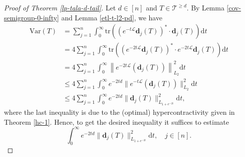 \documentclass{amsbook}
\theoremstyle{definition}
\theoremstyle{remark}
\numberwithin{section}{chapter}
\numberwithin{equation}{chapter}
\newcommand{\1}{\mathbf{1}}
\newcommand{\dc}{\mathbf{d}}
\begin{document}
\begin{proof}[Proof of Theorem \ref{lp-tala-d-tail}]
Let $d\in [n]$ and  $T\in \mathcal{T}^{\geq d}$.
By Lemma \ref{cov-semigroup-0-infty} and Lemma \ref{etl-t-l2-pd}, we have 
\begin{equation}\label{semigroup-approach-lp}
\begin{aligned}
\mathrm{Var}(T)
&=\sum_{j=1}^{n}\int_{0}^{\infty}\mathrm{tr}((e^{-t\mathcal{L}}\dc_{j}(T))^*\cdot \dc_{j}(T)) \mathrm{d}t\\
&=4\sum_{j=1}^{n}\int_{0}^{\infty}\mathrm{tr}((e^{-2t\mathcal{L}}\dc_{j}(T))^*\cdot e^{-2t\mathcal{L}}\dc_{j}(T)) \mathrm{d}t\\
&=4\sum_{j=1}^{n}\int_{0}^{\infty}\left\|e^{-2t\mathcal{L}}(\dc_{j}(T))\right\|^{2}_{L_{2}} \mathrm{d}t\\
&\leq 4\sum_{j=1}^{n}\int_{0}^{\infty}e^{-2td}\|e^{-t\mathcal{L}}(\dc_{j}(T))\|^{2}_{L_{2}}\mathrm{d}t\\
&\leq 4\sum_{j=1}^{n}\int_{0}^{\infty}e^{-2td}\|\dc_{j}(T)\|^{2}_{L_{1+e^{-2t}}} \mathrm{d}t,
\end{aligned}
\end{equation}
where the last inequality is due to the (optimal) hypercontractivity given in Theorem \ref{hc-1}.
Hence, to get the desired inequality it suffices to estimate
\begin{equation}\label{key-term}
\int_{0}^{\infty}e^{-2td}\|\dc_{j}(T)\|^{2}_{L_{1+e^{-2t}}}\mathrm{d}t,\quad j\in[n].
\end{equation}


\end{proof}
\end{document}
